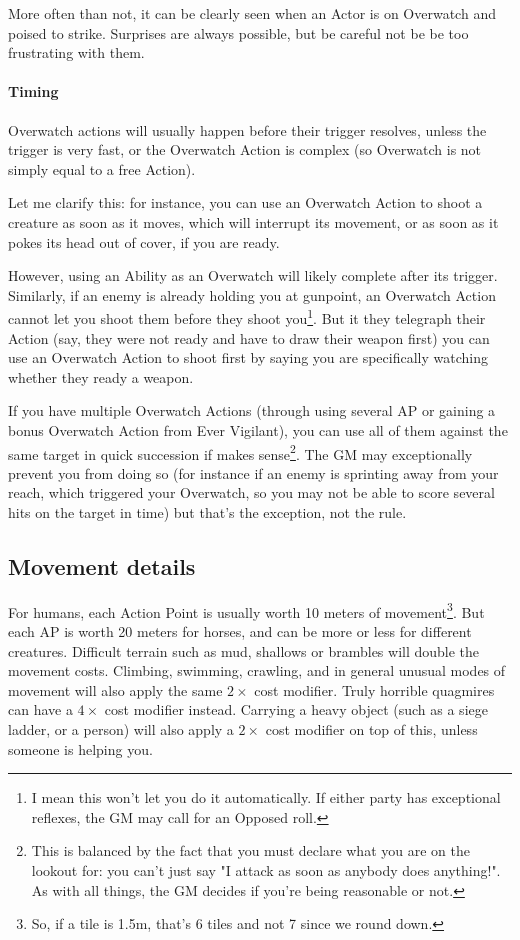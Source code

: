 More often than not, it can be clearly seen when an Actor is on Overwatch and poised to strike. Surprises are always possible, but be careful not be be too frustrating with them.


\paragraph{Timing}

Overwatch actions will usually happen before their trigger resolves, unless the trigger is very fast, or the Overwatch Action is complex (so Overwatch is not simply equal to a free Action). 

Let me clarify this: for instance, you can use an Overwatch Action to shoot a creature as soon as it moves, which will interrupt its movement, or as soon as it pokes its head out of cover, if you are ready.

However, using an Ability as an Overwatch will likely complete after its trigger. Similarly, if an enemy is already holding you at gunpoint, an Overwatch Action cannot let you shoot them before they shoot you\footnote{I mean this won't let you do it automatically. If either party has exceptional reflexes, the GM may call for an Opposed roll.}. But it they telegraph their Action (say, they were not ready and have to draw their weapon first) you can use an Overwatch Action to shoot first by saying you are specifically watching whether they ready a weapon. 

If you have multiple Overwatch Actions (through using several AP or gaining a bonus Overwatch Action from Ever Vigilant), you can use all of them against the same target in quick succession if makes sense\footnote{This is balanced by the fact that you must declare what you are on the lookout for: you can't just say "I attack as soon as anybody does anything!". As with all things, the GM decides if you're being reasonable or not.}. The GM may exceptionally prevent you from doing so (for instance if an enemy is sprinting away from your reach, which triggered your Overwatch, so you may not be able to score several hits on the target in time) but that's the exception, not the rule.


\subsection{Movement details}

For humans, each Action Point is usually worth 10 meters of movement\footnote{So, if a tile is 1.5m, that's 6 tiles and not 7 since we round down.}. But each AP is worth 20 meters for horses, and can be more or less for different creatures. Difficult terrain such as mud, shallows or brambles will double the movement costs. Climbing, swimming, crawling, and in general unusual modes of movement will also apply the same $2\times$ cost modifier. Truly horrible quagmires can have a $4\times$ cost modifier instead. Carrying a heavy object (such as a siege ladder, or a person) will also apply a $2\times$ cost modifier on top of this, unless someone is helping you. 

